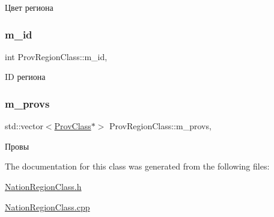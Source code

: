 Цвет региона 

\mbox{\label{class_prov_region_class_a507b91b7ae0374d4e4b0816dc3dc0c62}} 
\subsubsection{\texorpdfstring{m\+\_\+id}{m\_id}}
{\footnotesize\ttfamily int Prov\+Region\+Class\+::m\+\_\+id\hspace{0.3cm}{\ttfamily [protected]}, {\ttfamily [inherited]}}



ID региона 

\mbox{\label{class_prov_region_class_a2597561e1bac7e8514c57e9db3620e17}} 
\subsubsection{\texorpdfstring{m\+\_\+provs}{m\_provs}}
{\footnotesize\ttfamily std\+::vector$<$\hyperlink{class_prov_class}{Prov\+Class}$\ast$$>$ Prov\+Region\+Class\+::m\+\_\+provs\hspace{0.3cm}{\ttfamily [protected]}, {\ttfamily [inherited]}}



Провы 



The documentation for this class was generated from the following files\+:\begin{DoxyCompactItemize}
\item 
\hyperlink{_nation_region_class_8h}{Nation\+Region\+Class.\+h}\item 
\hyperlink{_nation_region_class_8cpp}{Nation\+Region\+Class.\+cpp}\end{DoxyCompactItemize}
